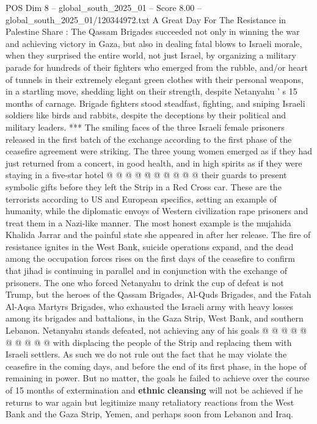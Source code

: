 \begin{textsample}{POS Dim 8 – global\_south\_2025\_01 – Score 8.00 – global\_south\_2025\_01/120344972.txt}  \label{ex:f8_pos_118}
A Great Day For The Resistance in Palestine Share : The Qassam Brigades succeeded not only in winning the war and achieving victory in Gaza, but also in dealing fatal blows to Israeli morale, when they surprised the entire world, not just Israel, by organizing a military parade for hundreds of their fighters who emerged from the rubble, and/or heart of tunnels in their extremely elegant green clothes with their personal weapons, in a startling move, shedding light on their strength, despite Netanyahu ' s 15 months of carnage.
Brigade fighters stood steadfast, fighting, and sniping Israeli soldiers like birds and rabbits, despite the deceptions by their political and military leaders. *** The smiling faces of the three Israeli female prisoners released in the first batch of the exchange according to the first phase of the ceasefire agreement were striking.
The three young women emerged as if they had just returned from a concert, in good health, and in high spirits as if they were staying in a five-star hotel @ @ @ @ @ @ @ @ @ @ their guards to present symbolic gifts before they left the Strip in a Red Cross car.
These are the terrorists according to US and European specifics, setting an example of humanity, while the diplomatic envoys of Western civilization rape prisoners and treat them in a Nazi-like manner.
The most honest example is the mujahida Khalida Jarrar and the painful state she appeared in after her release.
The fire of resistance ignites in the West Bank, suicide operations expand, and the dead among the occupation forces rises on the first days of the ceasefire to confirm that jihad is continuing in parallel and in conjunction with the exchange of prisoners.
The one who forced Netanyahu to drink the cup of defeat is not Trump, but the heroes of the Qassam Brigades, Al-Quds Brigades, and the Fatah Al-Aqsa Martyrs Brigades, who exhausted the Israeli army with heavy losses among its brigades and battalions, in the Gaza Strip, West Bank, and southern Lebanon.
Netanyahu stands defeated, not achieving any of his goals @ @ @ @ @ @ @ @ @ @ with displacing the people of the Strip and replacing them with Israeli settlers.
As such we do not rule out the fact that he may violate the ceasefire in the coming days, and before the end of its first phase, in the hope of remaining in power.
But no matter, the goals he failed to achieve over the course of 15 months of extermination and \textbf{ethnic} \textbf{cleansing} will not be achieved if he returns to war again but legitimize many retaliatory reactions from the West Bank and the Gaza Strip, Yemen, and perhaps soon from Lebanon and Iraq.

\end{textsample}
